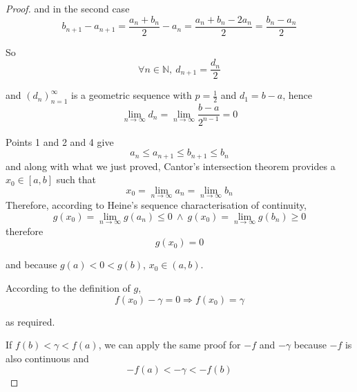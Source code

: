 \documentclass[english]{article}
\theoremstyle{plain}
\newcommand{\limi}{\underset{n\rightarrow\infty}{\lim}}
\begin{document}
\begin{proof}
and in the second case
\[
b_{n+1}-a_{n+1}=\frac{a_{n}+b_{n}}{2}-a_{n}=\frac{a_{n}+b_{n}-2a_{n}}{2}=\frac{b_{n}-a_{n}}{2}
\]

So 
\[
\forall n\in\mathbb{N},\ d_{n+1}=\frac{d_{n}}{2}
\]

and $\left(d_{n}\right)_{n=1}^{\infty}$ is a geometric sequence with
$p=\frac{1}{2}$ and $d_{1}=b-a$, hence
\[
\limi d_{n}=\limi\frac{b-a}{2^{n-1}}=0
\]

Points 1 and 2 and 4 give
\[
a_{n}\le a_{n+1}\le b_{n+1}\le b_{n}
\]
and along with what we just proved, Cantor's intersection theorem
provides a $x_{0}\in\left[a,b\right]$ such that
\[
x_{0}=\limi a_{n}=\limi b_{n}
\]
Therefore, according to Heine's sequence characterisation of continuity,
\[
g(x_{0})=\limi g(a_{n})\le0\ \wedge\ g(x_{0})=\limi g(b_{n})\ge0
\]
therefore 
\[
g(x_{0})=0
\]

and because $g(a)<0<g(b)$, $x_{0}\in\left(a,b\right)$.

According to the definition of $g$,
\[
f(x_{0})-\gamma=0\Rightarrow f(x_{0})=\gamma
\]

as required.

If $f(b)<\gamma<f(a)$, we can apply the same proof for $-f$ and
$-\gamma$ because $-f$ is also continuous and 
\[
-f(a)<-\gamma<-f(b)
\]
\end{proof}
\end{document}
